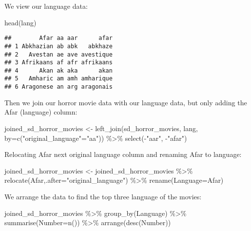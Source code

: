 \documentclass[
]{article}
\newenvironment{Shaded}{\begin{snugshade}}{\end{snugshade}}
\newcommand{\AttributeTok}[1]{\textcolor[rgb]{0.77,0.63,0.00}{#1}}
\newcommand{\FunctionTok}[1]{\textcolor[rgb]{0.00,0.00,0.00}{#1}}
\newcommand{\NormalTok}[1]{#1}
\newcommand{\OtherTok}[1]{\textcolor[rgb]{0.56,0.35,0.01}{#1}}
\newcommand{\SpecialCharTok}[1]{\textcolor[rgb]{0.00,0.00,0.00}{#1}}
\newcommand{\StringTok}[1]{\textcolor[rgb]{0.31,0.60,0.02}{#1}}
\begin{document}
We view our language data:

\begin{Shaded}
\begin{Highlighting}[]
\FunctionTok{head}\NormalTok{(lang)}
\end{Highlighting}
\end{Shaded}

\begin{verbatim}
##        Afar aa aar      afar
## 1 Abkhazian ab abk   abkhaze
## 2   Avestan ae ave avestique
## 3 Afrikaans af afr afrikaans
## 4      Akan ak aka      akan
## 5   Amharic am amh amharique
## 6 Aragonese an arg aragonais
\end{verbatim}

Then we join our horror movie data with our language data, but only
adding the Afar (language) column:

\begin{Shaded}
\begin{Highlighting}[]
\NormalTok{joined\_sd\_horror\_movies }\OtherTok{\textless{}{-}} \FunctionTok{left\_join}\NormalTok{(sd\_horror\_movies, lang, }\AttributeTok{by=}\FunctionTok{c}\NormalTok{(}\StringTok{"original\_language"}\OtherTok{=}\StringTok{"aa"}\NormalTok{)) }\SpecialCharTok{\%\textgreater{}\%} \FunctionTok{select}\NormalTok{(}\SpecialCharTok{{-}}\StringTok{"aar"}\NormalTok{, }\SpecialCharTok{{-}}\StringTok{"afar"}\NormalTok{)}
\end{Highlighting}
\end{Shaded}

Relocating Afar next original language column and renaming Afar to
language:

\begin{Shaded}
\begin{Highlighting}[]
\NormalTok{joined\_sd\_horror\_movies }\OtherTok{\textless{}{-}}\NormalTok{ joined\_sd\_horror\_movies }\SpecialCharTok{\%\textgreater{}\%} \FunctionTok{relocate}\NormalTok{(Afar,}\AttributeTok{.after=}\StringTok{"original\_language"}\NormalTok{) }\SpecialCharTok{\%\textgreater{}\%} \FunctionTok{rename}\NormalTok{(}\AttributeTok{Language=}\NormalTok{Afar)}
\end{Highlighting}
\end{Shaded}

We arrange the data to find the top three language of the movies:

\begin{Shaded}
\begin{Highlighting}[]
\NormalTok{joined\_sd\_horror\_movies }\SpecialCharTok{\%\textgreater{}\%} \FunctionTok{group\_by}\NormalTok{(Language) }\SpecialCharTok{\%\textgreater{}\%} \FunctionTok{summarise}\NormalTok{(}\AttributeTok{Number=}\FunctionTok{n}\NormalTok{()) }\SpecialCharTok{\%\textgreater{}\%} \FunctionTok{arrange}\NormalTok{(}\FunctionTok{desc}\NormalTok{(Number))}
\end{Highlighting}
\end{Shaded}
\end{document}
